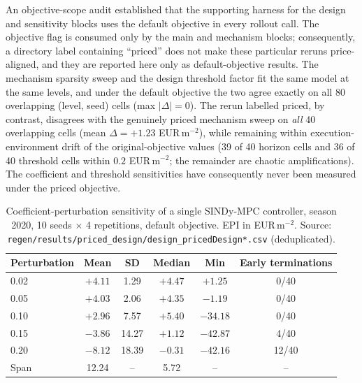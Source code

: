 An objective-scope audit established that the supporting harness for the design and
sensitivity blocks uses the default objective in every rollout call. The objective flag is
consumed only by the main and mechanism blocks; consequently, a directory label containing
``priced'' does not make these particular reruns price-aligned, and they are reported here
only as default-objective results. The mechanism sparsity sweep and the design threshold factor fit the same
model at the same levels, and under the default objective the two agree exactly on all 80
overlapping (level, seed) cells (max $|\Delta| = 0$). The rerun labelled priced, by
contrast, disagrees with the genuinely priced mechanism sweep on \emph{all} 40 overlapping
cells (mean $\Delta = +1.23$ EUR\,m$^{-2}$), while remaining within execution-environment
drift of the original-objective values (39 of 40 horizon cells and 36 of 40 threshold cells
within $0.2$ EUR\,m$^{-2}$; the remainder are chaotic amplifications). The coefficient and
threshold sensitivities have consequently never been measured under the priced objective.

\begin{table}[t]
\centering
\caption{Coefficient-perturbation sensitivity of a single SINDy-MPC controller, season
2020, 10 seeds $\times$ 4 repetitions, default objective. EPI in EUR\,m$^{-2}$. Source:
\texttt{regen/results/priced\_design/design\_pricedDesign*.csv} (deduplicated).}
\label{tab:sens}
\small
\begin{tabular}{@{}lccccc@{}}
\toprule
Perturbation & Mean & SD & Median & Min & Early terminations \\
\midrule
0.02 & $+4.11$ & 1.29  & $+4.47$ & $+1.25$  & 0/40 \\
0.05 & $+4.03$ & 2.06  & $+4.35$ & $-1.19$  & 0/40 \\
0.10 & $+2.96$ & 7.57  & $+5.40$ & $-34.18$ & 0/40 \\
0.15 & $-3.86$ & 14.27 & $+1.12$ & $-42.87$ & 4/40 \\
0.20 & $-8.12$ & 18.39 & $-0.31$ & $-42.16$ & 12/40 \\
\midrule
Span & 12.24 & -- & 5.72 & -- & -- \\
\bottomrule
\end{tabular}
\end{table}

